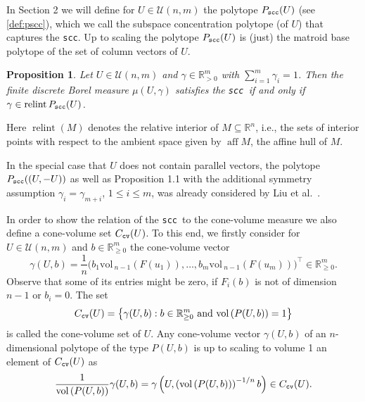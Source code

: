 \documentclass[11pt, a4paper, twoside, reqno]{amsart}
\DeclareMathOperator*{\aff}{aff}
\newcommand{\R}{\mathbb{R}}
\newtheorem{proposition}[theorem]{Proposition}
\theoremstyle{definition}
\theoremstyle{remark}
\newcommand{\vol}{\mathrm{vol}\,}
\newcommand{\scc}{{\tt scc}}
\newcommand{\cv}{{\tt cv}}
\DeclareMathOperator{\relint}{relint}
\numberwithin{equation}{section}
\begin{document}
In Section 2 we will define for $U\in\mathcal{U}(n,m)$ the polytope $P_{\scc}(U)$ (see \eqref{def:pscc}), which we call the subspace concentration polytope (of $U$) that captures the \scc. Up to scaling  the polytope $P_\scc(U)$ is (just) the matroid base polytope of the set of column vectors of $U$. 
\begin{proposition} Let $U\in\mathcal{U}(n,m)$ and $\gamma\in\R^m_{>0}$ with  $\sum_{i=1}^m \gamma_i=1$.  
  Then the finite discrete Borel measure $\mu(U,\gamma)$ satisfies the \scc\, if and only if $\gamma\in \relint P_\scc(U)$.
\label{prop:main}  
\end{proposition}
Here $\relint(M)$ denotes the relative interior of $M\subseteq\R^n$, i.e., the sets of interior points with respect to the ambient space
given by $\aff M$, the affine hull of $M$.

In the special case that $U$ does not contain parallel vectors, the polytope 
$P_\scc((U,-U))$ as well as Proposition 1.1 with the additional symmetry assumption $\gamma_i=\gamma_{m+i}$, $1\leq i\leq m$, was already considered by Liu et al.~\cite[Thm.~4.7]{LiuSunXiong2024b}.   

In order to show the relation of the \scc\, to the cone-volume measure we also define a cone-volume set $C_\cv(U)$. To this end, we firstly consider for $U\in\mathcal{U}(n,m)$ and  $b\in \R^m_{\geq 0}$ the cone-volume vector 
\begin{equation*}
  \gamma(U,b)=\frac{1}{n}\Big(b_1\vol_{n-1}(F(u_1)),\dots, b_m\vol_{n-1}(F(u_m))\Big)^\intercal\in \R^m_{\geq 0}. 
\end{equation*}
Observe that some of its entries might be zero, if $F_i(b)$ is not of dimension $n-1$ or $b_i=0$.  The set 
\begin{equation*}
  C_\cv(U)=\left\{ \gamma(U,b) : b\in\R^m_{\geq 0} \text{ and } \vol(P(U,b))=1\right\}
\end{equation*}
is called the cone-volume set of $U$.   
Any cone-volume vector $\gamma(U,b)$ of an $n$-dimensional polytope of the type $P(U,b)$ is up to scaling to volume 1 an element of $C_\cv(U)$ as   
\begin{equation}
 \frac{1}{\vol(P(U,b))}\gamma(U,b) = \gamma\left(U, \left(\vol(P(U,b)) \right)^{-1/n}b\right)\in C_\cv(U).
 \label{eq:scaling} 
\end{equation}
\end{document}
